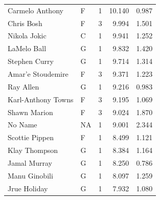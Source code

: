 \begin{table}[t]
\begin{tabular*}{\linewidth}{@{\extracolsep{\fill}}llcrr}
Carmelo Anthony & F & 1 & 10.140 & 0.987 \\ 
Chris Bosh & F & 3 & 9.994 & 1.501 \\ 
Nikola Jokic & C & 1 & 9.941 & 1.252 \\ 
LaMelo Ball & G & 1 & 9.832 & 1.420 \\ 
Stephen Curry & G & 1 & 9.714 & 1.314 \\ 
Amar'e Stoudemire & F & 3 & 9.371 & 1.223 \\ 
Ray Allen & G & 1 & 9.216 & 0.983 \\ 
Karl-Anthony Towns & F & 3 & 9.195 & 1.069 \\ 
Shawn Marion & F & 3 & 9.024 & 1.870 \\ 
No Name & NA & 1 & 9.001 & 2.344 \\ 
Scottie Pippen & F & 1 & 8.499 & 1.121 \\ 
Klay Thompson & G & 1 & 8.384 & 1.164 \\ 
Jamal Murray & G & 1 & 8.250 & 0.786 \\ 
Manu Ginobili & G & 1 & 8.097 & 1.259 \\ 
Jrue Holiday & G & 1 & 7.932 & 1.080 \\ 
\bottomrule
\end{tabular*}
\end{table}

